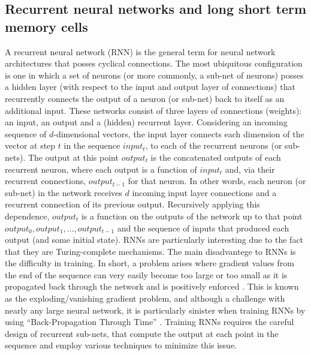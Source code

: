 \documentclass[utf8]{frontiersSCNS} %
\begin{document}
\subsection{Recurrent neural networks and long short term memory cells} \label{sec:rnns}

A recurrent neural network (RNN) is the general term for neural network architectures that posses cyclical connections. The most ubiquitous configuration is one in which a set of neurons (or more commonly, a sub-net of neurons) posses a hidden layer (with respect to the input and output layer of connections) that recurrently connects the output of a neuron (or sub-net) back to itself as an additional input. These networks consist of three layers of connections (weights): an input, an output and a (hidden) recurrent layer. Considering an incoming sequence of $d$-dimensional vectors, the input layer connects each dimension of the vector at step $t$ in the sequence $input_t$, to each of the recurrent neurons (or sub-nets). The output at this point $output_t$ is the concatenated outputs of each recurrent neuron, where each output is a function of $input_t$ and, via their recurrent connections, $output_{t-1}$ for that neuron. In other words, each neuron (or sub-net) in the network receives $d$ incoming input layer connections and a recurrent connection of its previous output. Recursively applying this dependence, $output_t$ is a function on the outputs of the network up to that point $output_0, output_1, ..., output_{t-1}$ and the sequence of inputs that produced each output (and some initial state). RNNs are particularly interesting due to the fact that they are Turing-complete mechanisms. The main disadvantege to RNNs is the difficulty in training. In short, a problem arises where gradient values from the end of the sequence can very easily become too large or too small as it is propagated back through the network and is positively enforced \cite{Hochreiter1997a}. This is known as the exploding/vanishing gradient problem, and although a challenge with nearly any large neural network, it is particularly sinister when training RNNs by using ``Back-Propagation Through Time'' \cite{Hochreiter1997a}. Training RNNs requires the careful design of recurrent sub-nets, that compute the output at each point in the sequence and employ various techniques to minimize this issue.   
\end{document}
